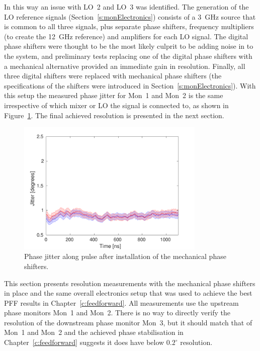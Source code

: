 In this way an issue with LO~2 and LO~3 was identified. The generation of the LO reference signals (Section~\ref{s:monElectronics}) consists of a 3~GHz source that is common to all three signals, plus separate phase shifters, frequency multipliers (to create the 12~GHz reference) and amplifiers for each LO signal. The digital phase shifters were thought to be the most likely culprit to be adding noise in to the system, and preliminary tests replacing one of the digital phase shifters with a mechanical alternative provided an immediate gain in resolution. Finally, all three digital shifters were replaced with mechanical phase shifters (the specifications of the shifters were introduced in Section~\ref{s:monElectronics}). With this setup the measured phase jitter for Mon~1 and Mon~2 is the same irrespective of which mixer or LO the signal is connected to, as shown in Figure~\ref{f:jitterMechanicalShifters}. The final achieved resolution is presented in the next section.

\begin{figure}
  \centering
  \includegraphics[width=0.8\textwidth]{Figures/phaseMons/jitterMechanicalShifters}
  \caption{Phase jitter along pulse after installation of the mechanical phase shifters.}
  \label{f:jitterMechanicalShifters}
\end{figure}



This section presents resolution measurements with the mechanical phase shifters in place and the same overall electronics setup that was used to achieve the best PFF results in Chapter~\ref{c:feedforward}. All measurements use the upstream phase monitors Mon~1 and Mon~2. There is no way to directly verify the resolution of the downstream phase monitor Mon~3, but it should match that of Mon~1 and Mon~2 and the achieved phase stabilisation in Chapter~\ref{c:feedforward} suggests it does have below \(0.2^\circ\) resolution.

